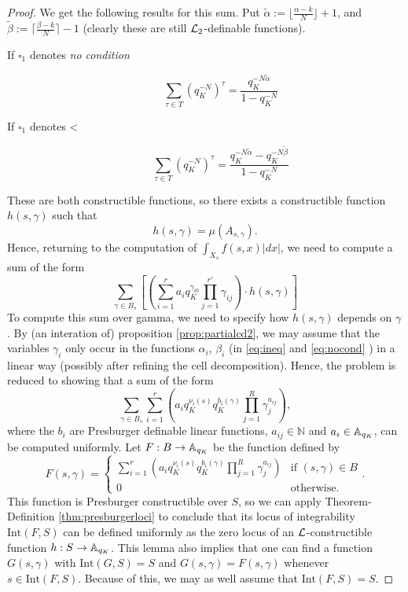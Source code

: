 \begin{proof}
We get the following results for this sum. 
Put $\tilde{\alpha}:= \lfloor\frac{\alpha -k}{N}\rfloor+1$, and $\tilde{\beta}:= \lceil\frac{\beta -k}{N}\rceil-1$ (clearly these are still $\Lm_2$-definable functions). 

\begin{description}
\item[If $\square_{1}$ denotes \emph{no condition}]
\begin{equation}\label{eq:nocond}\sum_{\tau \in T} (q_K^{-N})^\tau = \frac{q_K^{-N\tilde{\alpha}}}{1-q_K^{-N}} \end{equation}
\item[If $\square_{1}$ denotes <]
\begin{equation}\label{eq:ineq}\sum_{\tau \in T} (q_K^{-N})^\tau = \frac{q_K^{-N\tilde{\alpha}}-q_K^{-N\tilde{\beta}}}{1-q_K^{-N}} \end{equation}
\end{description}
These are both constructible functions, so there exists a constructible function $h(s,\gamma)$ such that \[h(s,\gamma) = \mu(A_{s, \gamma}).\]
Hence, returning to the computation of $\int_{X_s} f(s,x)|dx|$, we need to compute a sum of the form
\[\sum_{\gamma \in B_s}\left[ \left(\sum_{i=1}^r a_i q_K^{\gamma_{i0}} \prod_{j=1}^{r'}\gamma_{ij}\right) \cdot h(s,\gamma)\right]\]
To compute this sum over gamma, we need to specify how $h(s,\gamma)$ depends on $\gamma$. 
By (an interation of) proposition \ref{prop:partialcd2}, we may assume that the variables $\gamma_i$ only occur in the functions $\alpha_i$, $\beta_i$ (in \eqref{eq:ineq} and \eqref{eq:nocond} ) in a {\color{red} linear} way (possibly after refining the cell decomposition). Hence, the problem is reduced to showing that a sum of the form 
\[\sum_{\gamma \in B_s} \sum_{i=1}^r \left(a_i q_K^{\nu_i(s)}q_K^{b_i(\gamma)} \prod_{j=1}^{R}\gamma_{j}^{a_{ij}}\right),\]
where the $b_i$ are Presburger definable linear functions, %
$a_{ij} \in \mathbb{N}$ and $a_i \in \AA_{q_K}$, can be computed uniformly.
Let $F: B\to \AA_{q_K}$ be the function defined by
\[F(s,\gamma) = \left\{\begin{array}{ll}{\sum_{i=1}^r \left(a_i q_K^{\nu_i(s)}q_K^{b_i(\gamma)} \prod_{j=1}^{R}\gamma_{j}^{a_{ij}}\right)} & \text{if } (s,\gamma)\in B\\ 0 & \text{otherwise}.
\end{array}.\right.\]
This function is Presburger constructible over $S$, so we can apply
Theorem-Definition \ref{thm:presburgerloci} to conclude that its locus of integrability $\text{Int}(F,S)$ can be defined uniformly as the zero locus of an $\Lm$-constructible function $h: S\to \AA_{q_K}$. 
This lemma also implies that one can find a function $G(s,\gamma)$ with $\text{Int}(G,S)= S$ and $G(s,\gamma) = F(s,\gamma)$ whenever $s \in \text{Int}(F,S)$. Because of this, we may as well assume that $\text{Int}(F,S)=S$.


\end{proof}
